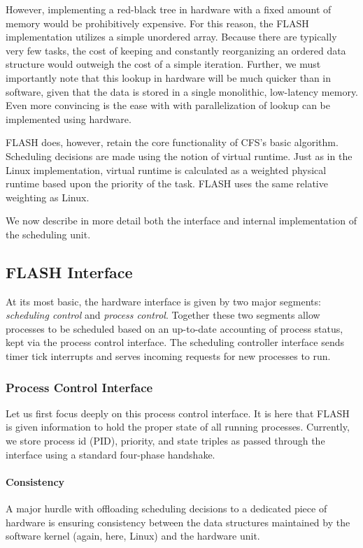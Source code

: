 \documentclass{sig-alternate-10pt}
\begin{document}
However, implementing a red-black tree in hardware with a fixed amount of
memory would be prohibitively expensive.  For this reason, the FLASH
implementation utilizes a simple unordered array.  Because there are
typically very few tasks, the cost of keeping and constantly reorganizing an
ordered data structure would outweigh the cost of a simple iteration.
Further, we must importantly note that this lookup in hardware will be much
quicker than in software, given that the data is stored in a single
monolithic, low-latency memory.  Even more convincing is the ease with with
parallelization of lookup can be implemented using hardware.

FLASH does, however, retain the core functionality of CFS's basic algorithm.
Scheduling decisions are made using the notion of virtual runtime.   Just as
in the Linux implementation, virtual runtime is calculated as a weighted
physical runtime based upon the priority of the task.  FLASH uses the same
relative weighting as Linux.

We now describe in more detail both the interface and internal
implementation of the scheduling unit.

\subsection{FLASH Interface}
At its most basic, the hardware interface is given by two major segments:
\emph{scheduling control} and \emph{process control}.  Together these two
segments allow processes to be scheduled based on an up-to-date accounting
of process status, kept via the process control interface.  The scheduling
controller interface sends timer tick interrupts and serves incoming
requests for new processes to run.

\subsubsection{Process Control Interface}
Let us first focus deeply on this process control interface.  It is here
that FLASH is given information to hold the proper state of all running
processes.  Currently, we store process id (PID), priority, and state
triples as passed through the interface using a standard four-phase
handshake.

\paragraph{Consistency} A major hurdle with offloading scheduling decisions
to a dedicated piece of hardware is ensuring consistency between the data
structures maintained by the software kernel (again, here, Linux) and the
hardware unit.
\end{document}
